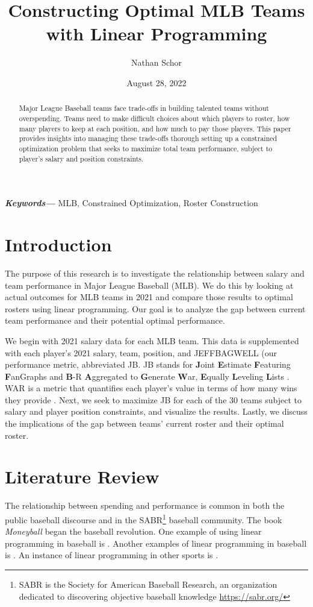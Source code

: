 \documentclass{article}
\title{Constructing Optimal MLB Teams with Linear Programming}
\author{Nathan Schor}
\date{August 28, 2022}
\begin{document}
\providecommand{\keywords}[1]
{
  \small	
  \textbf{\textit{Keywords---}} #1
}

\maketitle
\begin{abstract}
Major League Baseball teams face trade-offs in building talented teams without overspending. Teams need to make difficult choices about which players to roster, how many players to keep at each position, and how much to pay those players. This paper provides insights into managing these trade-offs thorough setting up a constrained optimization problem that seeks to maximize total team performance, subject to player's salary and position constraints. 
\end{abstract}
\keywords{MLB, Constrained Optimization, Roster Construction}
\newpage
\tableofcontents
\newpage
\section{Introduction}

The purpose of this research is to investigate the relationship between salary and team performance in Major League Baseball (MLB). We do this by looking at actual outcomes for MLB teams in 2021 and compare those results to optimal rosters using linear programming. Our goal is to analyze the gap between current team performance and their potential optimal performance. 

We begin with 2021 salary data for each MLB team. This data is supplemented with each player's 2021 salary, team, position, and JEFFBAGWELL (our performance metric, abbreviated JB. JB stands for \textbf{J}oint \textbf{E}stimate \textbf{F}eaturing \textbf{F}anGraphs and \textbf{B}-R \textbf{A}ggregated to \textbf{G}enerate \textbf{W}ar, \textbf{E}qually \textbf{L}eveling \textbf{L}ists \cite{JB}. WAR is a metric that quantifies each player's value in terms of how many wins they provide \cite{WAR}. Next, we seek to maximize JB for each of the 30 teams subject to salary and player position constraints, and visualize the results. Lastly, we discuss the implications of the gap between teams' current roster and their optimal roster.

\section{Literature Review}

The relationship between spending and performance is common in both the public baseball discourse and in the SABR\footnote{SABR is the Society for American Baseball Research, an organization dedicated to discovering objective baseball knowledge \url{https://sabr.org/}} baseball community. The book \emph{Moneyball} \cite{Moneyball} began the baseball revolution. One example of using linear programming in baseball is \cite{McIntyre2016}. Another examples of linear programming in baseball is \cite{Adler99baseball}. An instance of linear programming in other sports is \cite{Aramouni2021}.
\end{document}
